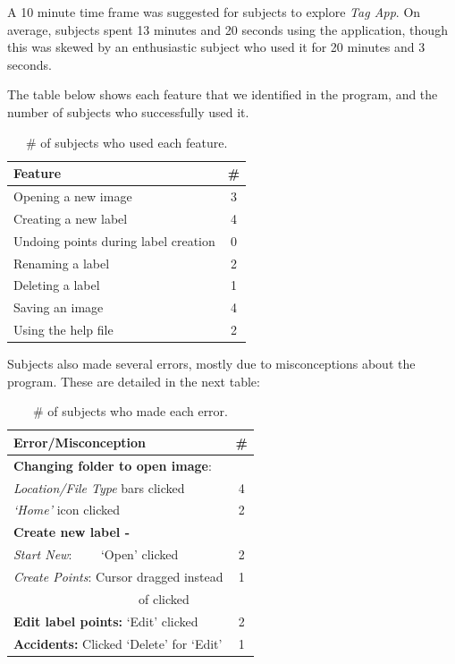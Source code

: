 \documentclass[11pt,twocolumn]{article}
\begin{document}
A 10 minute time frame was suggested for subjects to explore \emph{Tag App}. On average, subjects spent 13 minutes and 20 seconds using the application, though this was skewed by an enthusiastic subject who used it for 20 minutes and 3 seconds.

The table below shows each feature that we identified in the program, and the number of subjects who successfully used it.

\begin{table}[h!]
\centering
\begin{tabular}{|l|c|}
\hline
{\bf Feature } & {\bf \# } \\ 
\hline
Opening a new image & 3 \\
Creating a new label & 4 \\
Undoing points during label creation & 0 \\
Renaming a label & 2 \\
Deleting a label & 1 \\
Saving an image & 4 \\
Using the help file & 2 \\
\hline
\end{tabular}
\caption{\# of subjects who used each feature.}
\label{features}
\end{table}
 
Subjects also made several errors, mostly due to misconceptions about the program. These are detailed in the next table:

\begin{table}[h!]
\centering
\begin{tabular}{|l|c|}
\hline
{\bf Error/Misconception} & {\bf \#} \\
\hline
{\bf Changing folder to open image}: & \\
\emph{Location/File Type} bars clicked & 4 \\
\emph{`Home'} icon clicked & 2 \\
\hline
{\bf Create new label -} & \\
\emph{Start New}: \ \ \ \ `Open' clicked & 2 \\
\emph{Create Points}: Cursor dragged  instead & 1 \\
\ \ \ \ \ \ \ \ \ \ \ \  \ \ \ \ \ \ \ \ of clicked & \\
\hline
{\bf Edit label points:} `Edit' clicked & 2 \\
\hline
{\bf Accidents:} Clicked `Delete' for `Edit' & 1 \\
\hline
\end{tabular}
\caption{\# of subjects who made each error.}
\label{errors}
\end{table}
\end{document}
